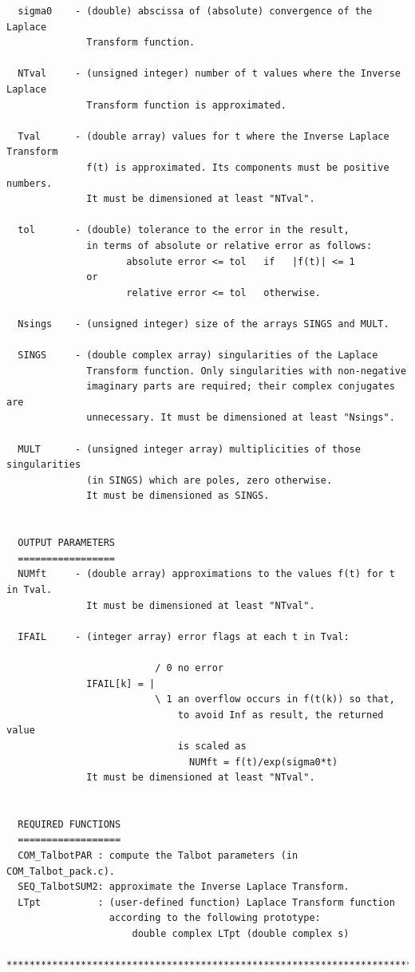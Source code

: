 \documentclass[a4paper,10pt]{report}%
\begin{document}
\begin{lstlisting}
  sigma0    - (double) abscissa of (absolute) convergence of the Laplace
              Transform function.

  NTval     - (unsigned integer) number of t values where the Inverse Laplace
              Transform function is approximated.

  Tval      - (double array) values for t where the Inverse Laplace Transform
              f(t) is approximated. Its components must be positive numbers.
              It must be dimensioned at least "NTval".

  tol       - (double) tolerance to the error in the result,
              in terms of absolute or relative error as follows:
                     absolute error <= tol   if   |f(t)| <= 1
              or
                     relative error <= tol   otherwise.

  Nsings    - (unsigned integer) size of the arrays SINGS and MULT.

  SINGS     - (double complex array) singularities of the Laplace
              Transform function. Only singularities with non-negative
              imaginary parts are required; their complex conjugates are
              unnecessary. It must be dimensioned at least "Nsings".

  MULT      - (unsigned integer array) multiplicities of those singularities
              (in SINGS) which are poles, zero otherwise.
              It must be dimensioned as SINGS.


  OUTPUT PARAMETERS
  =================
  NUMft     - (double array) approximations to the values f(t) for t in Tval.
              It must be dimensioned at least "NTval".

  IFAIL     - (integer array) error flags at each t in Tval:

                          / 0 no error
              IFAIL[k] = |
                          \ 1 an overflow occurs in f(t(k)) so that,
                              to avoid Inf as result, the returned value
                              is scaled as
                                NUMft = f(t)/exp(sigma0*t)
              It must be dimensioned at least "NTval".


  REQUIRED FUNCTIONS
  ==================
  COM_TalbotPAR : compute the Talbot parameters (in COM_Talbot_pack.c).
  SEQ_TalbotSUM2: approximate the Inverse Laplace Transform.
  LTpt          : (user-defined function) Laplace Transform function
                  according to the following prototype:
                      double complex LTpt (double complex s)

*****************************************************************************\
\end{lstlisting}
\end{document}
